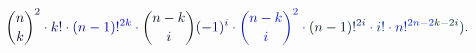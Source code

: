 \documentclass[12pt]{article}
\begin{document}
\makeatletter
\renewcommand*{\@textcolor}[3]{%
  \protect\leavevmode
  \begingroup
    \color#1{#2}#3%
  \endgroup
}
\makeatother
\begin{displaymath}
\mathcolor[RGB]{0,0,15}{\binom { \mathcolor[RGB]{0,0,30}{n} } { \mathcolor[RGB]{0,0,45}{k} } } ^ { \mathcolor[RGB]{0,0,60}{2} } \mathcolor[RGB]{0,0,75}{\cdot} \mathcolor[RGB]{0,0,90}{k} \mathcolor[RGB]{0,0,105}{!} \mathcolor[RGB]{0,0,120}{\cdot} \mathcolor[RGB]{0,0,135}{(} \mathcolor[RGB]{0,0,150}{n} \mathcolor[RGB]{0,0,165}{-} \mathcolor[RGB]{0,0,180}{1} \mathcolor[RGB]{0,0,195}{)} \mathcolor[RGB]{0,0,210}{!} ^ { \mathcolor[RGB]{0,0,225}{2} \mathcolor[RGB]{0,0,240}{k} } \mathcolor[RGB]{0,0,255}{\cdot} \mathcolor[RGB]{0,15,0}{\binom { \mathcolor[RGB]{0,15,15}{n} \mathcolor[RGB]{0,15,30}{-} \mathcolor[RGB]{0,15,45}{k} } { \mathcolor[RGB]{0,15,60}{i} } } \mathcolor[RGB]{0,15,75}{(} \mathcolor[RGB]{0,15,90}{-} \mathcolor[RGB]{0,15,105}{1} \mathcolor[RGB]{0,15,120}{)} ^ { \mathcolor[RGB]{0,15,135}{i} } \mathcolor[RGB]{0,15,150}{\cdot} \mathcolor[RGB]{0,15,165}{\binom { \mathcolor[RGB]{0,15,180}{n} \mathcolor[RGB]{0,15,195}{-} \mathcolor[RGB]{0,15,210}{k} } { \mathcolor[RGB]{0,15,225}{i} } } ^ { \mathcolor[RGB]{0,15,240}{2} } \mathcolor[RGB]{0,15,255}{\cdot} \mathcolor[RGB]{0,30,0}{(} \mathcolor[RGB]{0,30,15}{n} \mathcolor[RGB]{0,30,30}{-} \mathcolor[RGB]{0,30,45}{1} \mathcolor[RGB]{0,30,60}{)} \mathcolor[RGB]{0,30,75}{!} ^ { \mathcolor[RGB]{0,30,90}{2} \mathcolor[RGB]{0,30,105}{i} } \mathcolor[RGB]{0,30,120}{\cdot} \mathcolor[RGB]{0,30,135}{i} \mathcolor[RGB]{0,30,150}{!} \mathcolor[RGB]{0,30,165}{\cdot} \mathcolor[RGB]{0,30,180}{n} \mathcolor[RGB]{0,30,195}{!} ^ { \mathcolor[RGB]{0,30,210}{2} \mathcolor[RGB]{0,30,225}{n} \mathcolor[RGB]{0,30,240}{-} \mathcolor[RGB]{0,30,255}{2} \mathcolor[RGB]{0,45,0}{k} \mathcolor[RGB]{0,45,15}{-} \mathcolor[RGB]{0,45,30}{2} \mathcolor[RGB]{0,45,45}{i} } \mathcolor[RGB]{0,45,60}{)} \mathcolor[RGB]{0,45,75}{.}
\end{displaymath}
\end{document}
